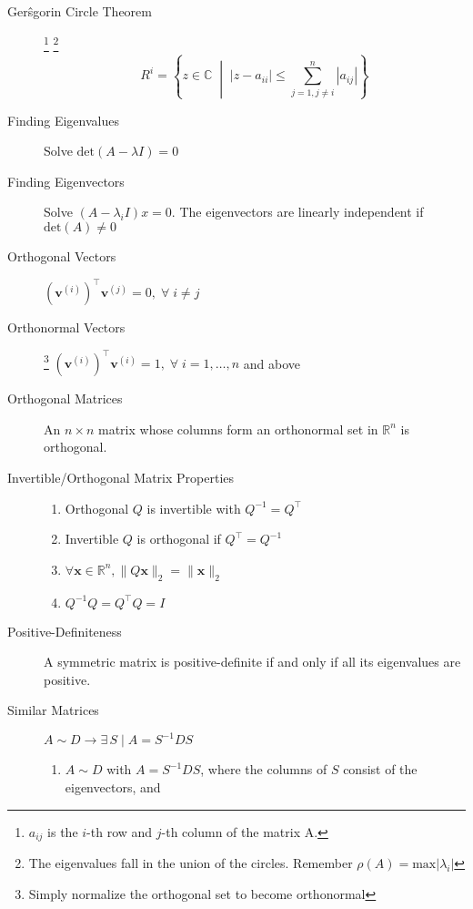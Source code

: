 \documentclass[8pt]{article}
\begin{document}

\begin{multicols}{2}
  \begin{description}
  \item[Ger\^{s}gorin Circle Theorem] \footnote{$a_{ij}$ is the $i$-th row and $j$-th column of the
      matrix A.}  \footnote{The eigenvalues fall in the union of the circles. Remember
      $\rho(A)=\text{max}|\lambda_i|$}
    $$R^i=\left\{z\in\mathbb{C} \;\middle|\; |z-a_{ii}|\leq\sum_{j=1,j \neq i}^{n}|a_{ij}|\right\}$$
  \item[Finding Eigenvalues] Solve $\mathrm{det}(A-\lambda I)=0$
  \item[Finding Eigenvectors] Solve $(A-\lambda_iI)x=0$. The eigenvectors are linearly independent
    if $\mathrm{det}(A)\neq 0$
  \item[Orthogonal Vectors]
    $(\mathbf{v}^{(i)})^\top\mathbf{v}^{(j)}=0, \;\forall\; i\neq j$
  \item[Orthonormal Vectors]
    \footnote{Simply normalize the orthogonal set to become orthonormal}
    $(\mathbf{v}^{(i)})^\top\mathbf{v}^{(i)}=1, \;\forall\; i=1,\dots,n$ and above
  \item[Orthogonal Matrices] An $n \times n$ matrix whose columns form an orthonormal set in
    $\mathbb{R}^n$ is orthogonal.
  \item[Invertible/Orthogonal Matrix Properties] \hfill
    \begin{enumerate}[i]
    \item Orthogonal $Q$ is invertible with $Q^{-1}=Q^\top$
    \item Invertible $Q$ is orthogonal if $Q^\top=Q^{-1}$
    \item $\forall\mathbf{x} \in \mathbb{R}^n,\|Q\mathbf{x}\|_2=\|\mathbf{x}\|_2$
    \item $Q^{-1}Q=Q^\top Q=I$
    \end{enumerate}
  \item[Positive-Definiteness] A symmetric matrix is positive-definite if and only if all its
    eigenvalues are positive.
  \item[Similar Matrices] $A \sim D \to \exists\,S\;|\;A=S^{-1}DS$
    \begin{enumerate}[i]
    \item $A \sim D$ with $A = S^{-1}DS$, where the columns of $S$ consist of the eigenvectors, and

\end{enumerate}
\end{description}
\end{multicols}
\end{document}
